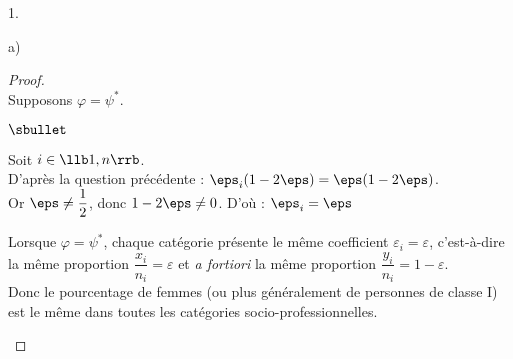 \begin{noliste}{1.}
\begin{noliste}{a)}
  \begin{proof}~\\
  Supposons $\varphi=\psi^*$.
    \begin{noliste}{$\sbullet$}
      \item Soit $i \in \llb 1,n \rrb$.\\
      D'après la question précédente : $\eps_i(1-2\eps) = 
      \eps(1-2\eps)$.\\
      Or $\eps \neq \dfrac{1}{2}$, donc $1-2\eps \neq 0$. D'où :
      $
        \eps_i = \eps
      $
      
      \item Lorsque $\varphi = \psi^*$, chaque catégorie présente 
      le même coefficient $\varepsilon_i = \varepsilon$, c'est-à-dire 
      la même proportion $\dfrac{x_i}{n_i} = \varepsilon$ et \emph{a 
      fortiori} la même proportion $\dfrac{y_i}{n_i} = 
      1-\varepsilon$.\\[.1cm]      
      Donc le pourcentage de femmes (ou plus généralement de personnes
      de classe I) est le même dans toutes les catégories 
      socio-professionnelles. 
      ~\\[-1cm]
    \end{noliste}
  \end{proof}

 \end{noliste}
\end{noliste}






